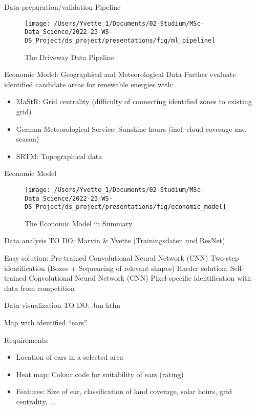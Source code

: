 \documentclass[
  ignorenonframetext,
]{beamer}
\begin{document}
\begin{frame}{Data preparation/validation Pipeline}
\protect\hypertarget{data-preparationvalidation-pipeline}{}
\begin{figure}
\texttt{[image: /Users/Yvette\_1/Documents/02-Studium/MSc-Data\_Science/2022-23-WS-DS\_Project/ds\_project/presentations/fig/ml\_pipeline]} \caption{The Driveway Data Pipeline}\label{fig:unnamed-chunk-4}
\end{figure}
\end{frame}

\begin{frame}{Economic Model: Geographical and Meteorological Data}
\protect\hypertarget{economic-model-geographical-and-meteorological-data}{}
Further evaluate identified candidate areas for renewable energies with:

\begin{itemize}
\item MaStR: Grid centrality (difficulty of connecting identified zones to existing grid)
\item German Meteorological Service: Sunshine hours (incl. cloud coverage and season)
\item SRTM: Topographical data
\end{itemize}
\end{frame}

\begin{frame}{Economic Model}
\protect\hypertarget{economic-model}{}
\begin{figure}
\texttt{[image: /Users/Yvette\_1/Documents/02-Studium/MSc-Data\_Science/2022-23-WS-DS\_Project/ds\_project/presentations/fig/economic\_model]} \caption{The Economic Model in Summary}\label{fig:unnamed-chunk-5}
\end{figure}
\end{frame}

\begin{frame}{Data analysis}
\protect\hypertarget{data-analysis}{}
TO DO: Marvin \& Yvette (Trainingsdaten und ResNet)

Easy solution: Pre-trained Convolutional Neural Network (CNN) Two-step
identification (Boxes + Sequencing of relevant shapes) Harder solution:
Self-trained Convolutional Neural Network (CNN) Pixel-specific
identification with data from competition
\end{frame}

\begin{frame}{Data visualization}
\protect\hypertarget{data-visualization}{}
TO DO: Jan htlm

Map with identified ``ears''

Requirements:

\begin{itemize}
\item Location of ears in a selected area
\item Heat map: Colour code for suitability of ears (rating)
\item Features: Size of ear, classification of land coverage, solar hours, grid centrality, ...
\end{itemize}
\end{frame}
\end{document}
